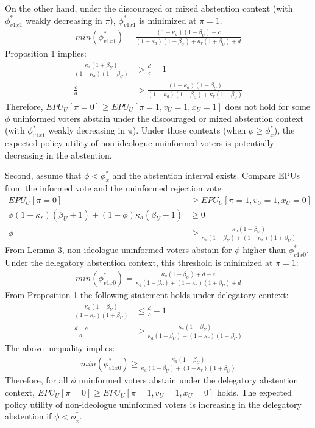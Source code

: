 \par On the other hand, under the discouraged or mixed abstention context (with $\phi^*_{v1x1}$ weakly decreasing in $\pi$), $\phi^*_{v1x1}$ is minimized at $\pi=1$.
\begin{align*}
min(\phi^*_{v1x1}) = \frac{(1-\kappa_a)(1-\beta_U)+c}{(1-\kappa_a)(1-\beta_U)+\kappa_r(1+\beta_U)+d}
\end{align*}
\noindent Proposition 1 implies:
\begin{align*}
\frac{\kappa_r(1+\beta_U)}{(1-\kappa_a)(1-\beta_U)} &> \frac{d}{c} - 1\\
\frac{c}{d} &> \frac{(1-\kappa_a)(1-\beta_U)}{(1-\kappa_a)(1-\beta_U)+\kappa_r(1+\beta_U)}
\end{align*}
\noindent Therefore, $EPU_U[\pi=0] \geq EPU_U[\pi=1,v_U=1,x_U=1]$ does not hold for some $\phi$ uninformed voters abstain under the discouraged or mixed abstention context (with $\phi^*_{v1x1}$ weakly decreasing in $\pi$). Under those contexts (when $\phi \geq \phi^*_x$), the expected policy utility of non-ideologue uninformed voters is potentially decreasing in the abstention.

\par Second, assume that $\phi < \phi^*_x$ and the abstention interval exists. Compare EPUs from the informed vote and the uninformed rejection vote.  
\begin{align*}
EPU_U[\pi=0] &\geq EPU_U[\pi=1,v_U=1,x_U=0] \\
\phi(1-\kappa_r)(\beta_U+1) + (1-\phi)\kappa_a(\beta_U-1) &\geq 0 \\
\phi &\geq \frac{\kappa_a(1-\beta_U)}{\kappa_a(1-\beta_U)+(1-\kappa_r)(1+\beta_U)}
\end{align*}
\noindent From Lemma 3, non-ideologue uninformed voters abstain for $\phi$ higher than $\phi^*_{v1x0}$. Under the delegatory abstention context, this threshold is minimized at $\pi=1$: 
\begin{align*}
min(\phi^*_{v1x0}) = \frac{\kappa_a(1-\beta_U)+d-c}{\kappa_a(1-\beta_U)+(1-\kappa_r)(1+\beta_U)+d}
\end{align*}
From Proposition 1 the following statement holds under delegatory context: 
\begin{align*}
\frac{\kappa_a(1-\beta_U)}{(1-\kappa_r)(1+\beta_U)} &\leq \frac{d}{c} - 1 \\
\frac{d-c}{d} &\geq \frac{\kappa_a(1-\beta_U)}{\kappa_a(1-\beta_U)+(1-\kappa_r)(1+\beta_U)}
\end{align*}
The above inequality implies:  
\begin{align*}
min(\phi^*_{v1x0}) \geq \frac{\kappa_a(1-\beta_U)}{\kappa_a(1-\beta_U)+(1-\kappa_r)(1+\beta_U)}
\end{align*}
\noindent Therefore, for all $\phi$ uninformed voters abstain under the delegatory abstention context, $EPU_U[\pi=0] \geq EPU_U[\pi=1,v_U=1,x_U=0]$ holds. The expected policy utility of non-ideologue uninformed voters is increasing in the delegatory abstention if $\phi < \phi^*_x$. 


